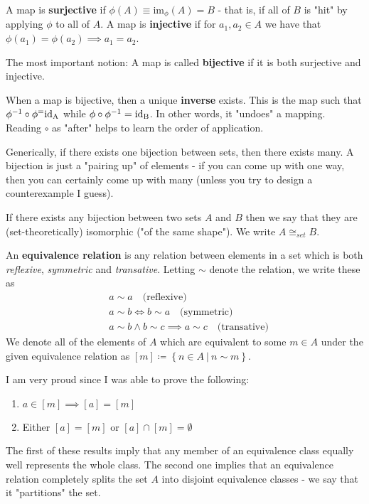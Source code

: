     \begin{deff}
        A map is \textbf{surjective} if \(\phi (A) \equiv \text{im}_{\phi }(A) = B\) - that is, if all of \(B\) is "hit" by applying \(\phi \) to all of \(A\). A map is \textbf{injective} if for \(a_1, a_2 \in A\) we have that \(\phi (a_1) = \phi (a_2) \implies a_1 = a_2\). 
        
        The most important notion: A map is called \textbf{bijective} if it is both surjective and injective. 
\end{deff}
\begin{deff}
    When a map is bijective, then a unique \textbf{inverse} exists. This is the map such that \(\phi^{-1}  \circ \phi^ = \rm{id}_A\) while \(\phi \circ \phi ^{-1} = \rm{id}_B\). In other words, it "undoes" a mapping. Reading \(\circ\) as "after" helps to learn the order of application.    
\end{deff}
\begin{rem}
    Generically, if there exists one bijection between sets, then there exists many. A bijection is just a "pairing up" of elements - if you can come up with one way, then you can certainly come up with many (unless you try to design a counterexample I guess).
\end{rem}
\begin{deff}
    If there exists any bijection between two sets \(A\) and \(B\) then we say that they are (set-theoretically) isomorphic ("of the same shape"). We write \(A \cong_{set}  B\).   
\end{deff}
\begin{deff}
    An \textbf{equivalence relation} is any relation between elements in a set which is both \textit{reflexive}, \textit{symmetric} and \textit{transative}. Letting \(\sim\) denote the relation, we write these as \begin{align*}
        &a \sim a\quad \text{(reflexive)}\\
        &a \sim b \iff b \sim a\quad \text{(symmetric)}\\
        &a \sim b \wedge b \sim c \implies a \sim c\quad \text{(transative)}
    \end{align*} 
    We denote all of the elements of \(A\) which are equivalent to some \(m \in A\) under the given equivalence relation as \([m] \coloneqq \left\{ n \in A\ | \ n \sim m \right\} \).
\end{deff}
\begin{rem}
    I am very proud since I was able to prove the following: \begin{enumerate}[label=\roman*)]
        \item \(a \in [m] \implies [a] = [m]\)
        \item Either \([a] = [m]\) or \([a] \cap [m] = \emptyset \) 
    \end{enumerate}
    The first of these results imply that any member of an equivalence class equally well represents the whole class. The second one implies that an equivalence relation completely splits the set \(A\) into disjoint equivalence classes - we say that it "partitions" the set. 
\end{rem}
